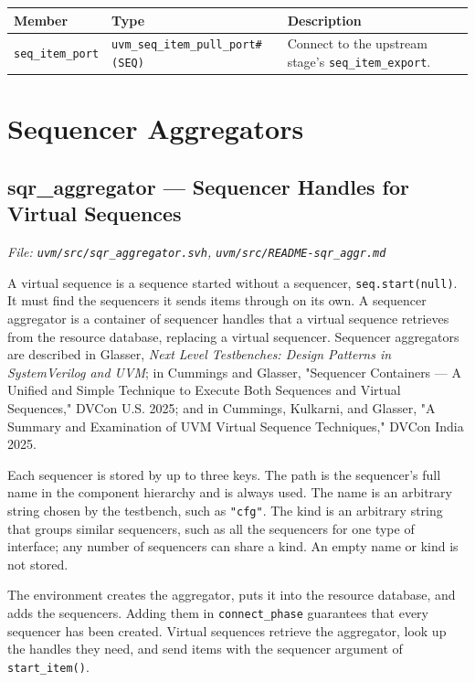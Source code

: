 \documentclass[11pt,letterpaper]{report}
\begin{document}
\begin{xltabular}{\linewidth}{>{\small}p{1.5in} >{\small}p{1.5in} >{\small}X}
\toprule
\textbf{Member} & \textbf{Type} & \textbf{Description} \\
\midrule
\endhead
\bottomrule
\endfoot
\texttt{seq\_item\_port} & \texttt{uvm\_seq\_item\_pull\_port\#(SEQ)} & Connect to the upstream stage's \texttt{seq\_item\_export}. \\
\end{xltabular}

\chapter{Sequencer Aggregators}
\section{sqr\_aggregator --- Sequencer Handles for Virtual Sequences}
\noindent\small\textit{File: \texttt{uvm/src/sqr\_aggregator.svh}, \texttt{uvm/src/README-sqr\_aggr.md}}\par

A virtual sequence is a sequence started without a sequencer, \texttt{seq.start(null)}. It must find the sequencers it sends items through on its own. A sequencer aggregator is a container of sequencer handles that a virtual sequence retrieves from the resource database, replacing a virtual sequencer. Sequencer aggregators are described in Glasser, \textit{Next Level Testbenches: Design Patterns in SystemVerilog and UVM}; in Cummings and Glasser, "Sequencer Containers --- A Unified and Simple Technique to Execute Both Sequences and Virtual Sequences," DVCon U.S. 2025; and in Cummings, Kulkarni, and Glasser, "A Summary and Examination of UVM Virtual Sequence Techniques," DVCon India 2025.

Each sequencer is stored by up to three keys. The path is the sequencer's full name in the component hierarchy and is always used. The name is an arbitrary string chosen by the testbench, such as \texttt{"cfg"}. The kind is an arbitrary string that groups similar sequencers, such as all the sequencers for one type of interface; any number of sequencers can share a kind. An empty name or kind is not stored.

The environment creates the aggregator, puts it into the resource database, and adds the sequencers. Adding them in \texttt{connect\_phase} guarantees that every sequencer has been created. Virtual sequences retrieve the aggregator, look up the handles they need, and send items with the sequencer argument of \texttt{start\_item()}.
\end{document}
